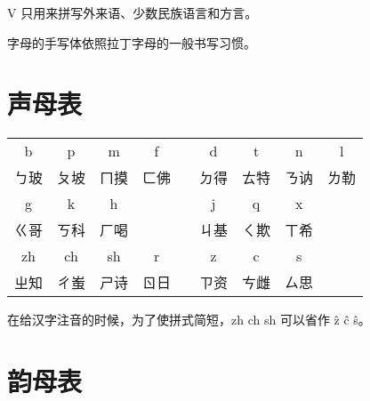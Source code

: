 \documentclass[zihao=-4,fontset=none]{ctexart}
\begin{document}
V 只用来拼写外来语、少数民族语言和方言。

字母的手写体依照拉丁字母的一般书写习惯。

\section{声母表}

\begin{center}
  \begin{tabular}{*{9}{c}}
    b    & p    & m    & f    &  & d    & t    & n    & l    \\
    ㄅ玻 & ㄆ坡 & ㄇ摸 & ㄈ佛 &  & ㄉ得 & ㄊ特 & ㄋ讷 & ㄌ勒 \\
    \hline
    g    & k    & h    &      &  & j    & q    & x    &      \\
    ㄍ哥 & ㄎ科 & ㄏ喝 &      &  & ㄐ基 & ㄑ欺 & ㄒ希 &      \\
    \hline
    zh   & ch   & sh   & r    &  & z    & c    & s    &      \\
    ㄓ知 & ㄔ蚩 & ㄕ诗 & ㄖ日 &  & ㄗ资 & ㄘ雌 & ㄙ思 &
  \end{tabular}
\end{center}

在给汉字注音的时候，为了使拼式简短，zh ch sh 可以省作 ẑ ĉ ŝ。

\section{韵母表}
\end{document}
